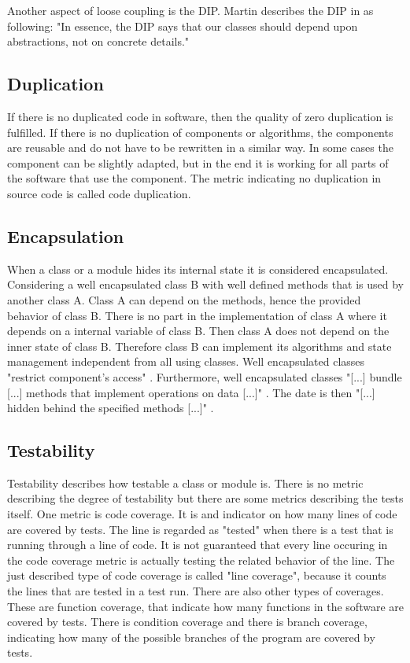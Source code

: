 Another aspect of loose coupling is the \ac{DIP}. 
Martin describes the \ac{DIP} in \cite{cc} as following: "In essence, the DIP says that our classes should depend upon abstractions, not on concrete details." \cite{cc}

\subsection*{Duplication}
\label{duplication}
If there is no duplicated code in software, then the quality of zero duplication is fulfilled. If there is no duplication of components or algorithms, the components are reusable and do not have to be rewritten in a similar way. In some cases the component can be slightly adapted, but in the end it is working for all parts of the software that use the component. 
The metric indicating no duplication in source code is called code duplication. 

\subsection*{Encapsulation}
\label{encapsulation}
When a class or a module hides its internal state it is considered encapsulated. Considering a well encapsulated class B with well defined methods that is used by another class A.  Class A can depend on the methods, hence the provided behavior of class B.
There is no part in the implementation of class A where it depends on a internal variable of class B. Then class A does not depend on the inner state of class B. Therefore class B can implement its algorithms and state management independent from all using classes. 
Well encapsulated classes "restrict component's access" \cite[Encapsulation]{wiki}. Furthermore, well encapsulated classes "[...] bundle [...] methods that implement operations on data [...]" \cite[Encapuslation]{wiki}. The date is then "[...] hidden behind the specified methods [...]" \cite[Encapsulation]{wiki}.

\subsection*{Testability}
\label{testability}
Testability describes how testable a class or module is. There is no metric describing the degree of testability but there are some metrics describing the tests itself. 
One metric is code coverage. It is and indicator on how many lines of code are covered by tests. The line is regarded as "tested" when there is a test that is running through a line of code. It is not guaranteed that every line occuring in the code coverage metric is actually testing the related behavior of the line. 
The just described type of code coverage is called "line coverage", because it counts the lines that are tested in a test run. There are also other types of coverages. These are function coverage, that indicate how many functions in the software are covered by tests. There is condition coverage and there is branch coverage, indicating how many of the possible branches of the program are covered by tests. 

